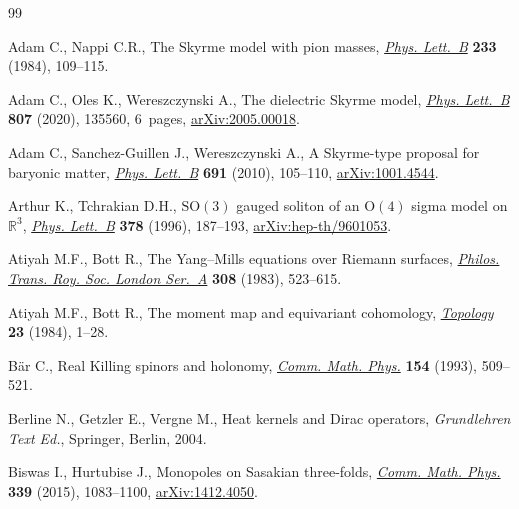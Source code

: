 \documentclass[pdftex]{sigma}
\newcommand{\1}{{\mathbb{1}}}
\numberwithin{equation}{section}
\begin{document}
\begin{thebibliography}{99}
\footnotesize\itemsep=0pt

Adam C., Nappi C.R., The {S}kyrme model with pion masses, \href{https://doi.org/10.1016/0550-3213(84)90172-X}{\textit{Phys.
 Lett.~B}} \textbf{233} (1984), 109--115.

Adam C., Oles K., Wereszczynski A., The dielectric {S}kyrme model,
 \href{https://doi.org/10.1016/j.physletb.2020.135560}{\textit{Phys. Lett.~B}} \textbf{807} (2020), 135560, 6~pages,
 \href{https://arxiv.org/abs/2005.00018}{arXiv:2005.00018}.

Adam C., Sanchez-Guillen J., Wereszczynski A., A {S}kyrme-type proposal for
 baryonic matter, \href{https://doi.org/10.1016/j.physletb.2010.06.025}{\textit{Phys. Lett.~B}} \textbf{691} (2010), 105--110,
 \href{https://arxiv.org/abs/1001.4544}{arXiv:1001.4544}.

Arthur K., Tchrakian D.H., {$\mathrm{SO}(3)$} gauged soliton of an {$\mathrm{O}(4)$} sigma model
 on {$\mathbb{R}^3$}, \href{https://doi.org/10.1016/0370-2693(96)00343-7}{\textit{Phys. Lett.~B}} \textbf{378} (1996), 187--193,
 \href{https://arxiv.org/abs/hep-th/9601053}{arXiv:hep-th/9601053}.

Atiyah M.F., Bott R., The {Y}ang--{M}ills equations over {R}iemann surfaces,
 \href{https://doi.org/10.1098/rsta.1983.0017}{\textit{Philos. Trans. Roy. Soc. London Ser.~A}} \textbf{308} (1983),
 523--615.

Atiyah M.F., Bott R., The moment map and equivariant cohomology,
 \href{https://doi.org/10.1016/0040-9383(84)90021-1}{\textit{Topology}} \textbf{23} (1984), 1--28.

B\"ar C., Real {K}illing spinors and holonomy, \href{https://doi.org/10.1007/BF02102106}{\textit{Comm. Math. Phys.}}
 \textbf{154} (1993), 509--521.

Berline N., Getzler E., Vergne M., Heat kernels and {D}irac operators,
 \textit{Grundlehren Text Ed.}, Springer, Berlin, 2004.

Biswas I., Hurtubise J., Monopoles on {S}asakian three-folds, \href{https://doi.org/10.1007/s00220-015-2444-3}{\textit{Comm.
 Math. Phys.}} \textbf{339} (2015), 1083--1100, \href{https://arxiv.org/abs/1412.4050}{arXiv:1412.4050}.


\end{thebibliography}
\end{document}
